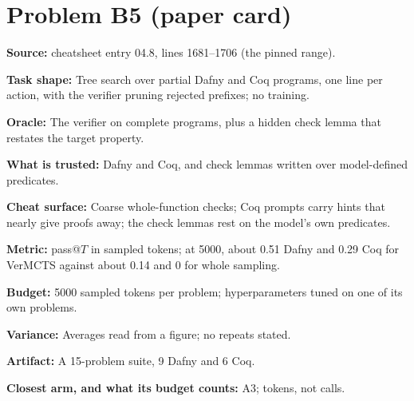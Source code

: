\documentclass[11pt]{article}
\begin{document}
\section*{Problem B5 (paper card)}\label{ans:B5}
\begin{answer}
\textbf{Source:} cheatsheet entry 04.8, lines 1681--1706 (the pinned range).

\textbf{Task shape:} Tree search over partial Dafny and Coq programs, one line per
action, with the verifier pruning rejected prefixes; no training.

\textbf{Oracle:} The verifier on complete programs, plus a hidden check lemma that
restates the target property.

\textbf{What is trusted:} Dafny and Coq, and check lemmas written over model-defined
predicates.

\textbf{Cheat surface:} Coarse whole-function checks; Coq prompts carry hints that
nearly give proofs away; the check lemmas rest on the model's own predicates.

\textbf{Metric:} pass@$T$ in sampled tokens; at 5000, about 0.51 Dafny and 0.29 Coq for
VerMCTS against about 0.14 and 0 for whole sampling.

\textbf{Budget:} 5000 sampled tokens per problem; hyperparameters tuned on one of its
own problems.

\textbf{Variance:} Averages read from a figure; no repeats stated.

\textbf{Artifact:} A 15-problem suite, 9 Dafny and 6 Coq.

\textbf{Closest arm, and what its budget counts:} A3; tokens, not calls.
\end{answer}
\end{document}
